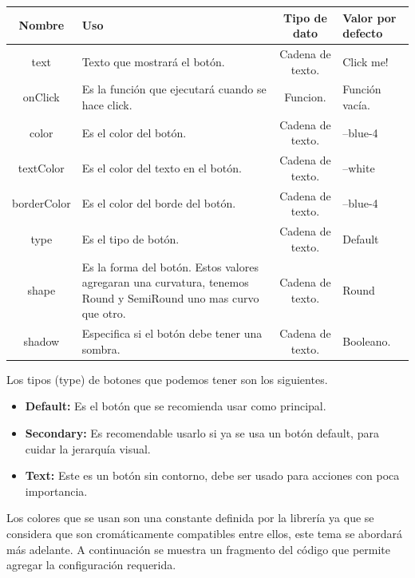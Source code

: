 \begin{center}
 \begin{tabular}{ | c |  p{5cm}  | c | p{3cm} |} 
 \hline
 \textbf{Nombre} &  \textbf{Uso} &  \textbf{ Tipo de dato} &  \textbf{Valor por defecto}\\ [0.5ex] 
 \hline\hline
text & Texto que mostrará el botón.  &  Cadena de texto. & Click me! \\  [2.5ex] 
 \hline
onClick & Es la función que ejecutará cuando se hace click. & Funcion. & Función vacía. \\[2.5ex] 
 \hline
color &  Es el color del botón. & Cadena de texto. & --blue-4 \\[3.5ex] 
 \hline
 textColor & Es el color del texto en el botón. &  Cadena de texto. & --white \\[2.5ex] 
 \hline
borderColor & Es el color del borde del botón. & Cadena de texto. & --blue-4 \\ [2.5ex] 
 \hline
 type & Es el tipo de botón. & Cadena de texto. & Default \\ [2.5ex] 
 \hline
 shape & Es la forma del botón. Estos valores agregaran una curvatura, tenemos Round y SemiRound uno mas curvo que otro. & Cadena de texto. & Round \\ [2.5ex] 
 \hline
 shadow & Especifica si el botón debe tener una sombra. & Cadena de texto. & Booleano. \\ [2.5ex] 
 \hline
\end{tabular}
\end{center}
\newline
\newline
\newline
Los tipos (type) de botones que podemos tener son los siguientes.
\begin{itemize}
\item \textbf{Default:} Es el botón que se recomienda usar como principal.
\item \textbf{Secondary:} Es recomendable usarlo si ya se usa un botón default, para cuidar la jerarquía visual.
\item \textbf{Text:} Este es un botón sin contorno, debe ser usado para acciones con poca importancia.
\end{itemize}
Los colores que se usan son una constante definida por la librería ya que se considera que son cromáticamente compatibles entre ellos, este tema se abordará más adelante.
A continuación se muestra un fragmento del código que permite agregar la configuración requerida.
\newline
